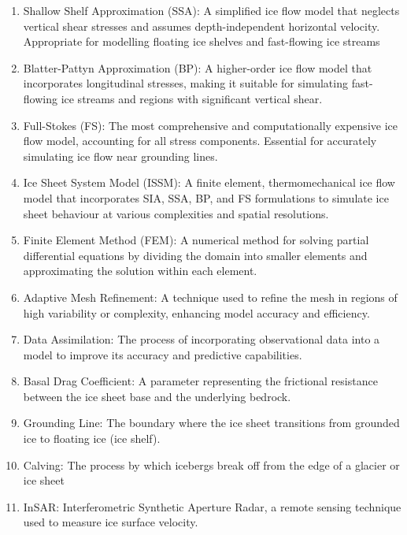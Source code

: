 \begin{enumerate}
\item Shallow Shelf Approximation (SSA): A simplified ice flow model that neglects vertical shear stresses and assumes depth-independent horizontal velocity. Appropriate for modelling floating ice shelves and fast-flowing ice streams
\item Blatter-Pattyn Approximation (BP): A higher-order ice flow model that incorporates longitudinal stresses, making it suitable for simulating fast-flowing ice streams and regions with significant vertical shear.
\item Full-Stokes (FS): The most comprehensive and computationally expensive ice flow model, accounting for all stress components. Essential for accurately simulating ice flow near grounding lines.
\item Ice Sheet System Model (ISSM): A finite element, thermomechanical ice flow model that incorporates SIA, SSA, BP, and FS formulations to simulate ice sheet behaviour at various complexities and spatial resolutions. 
\item Finite Element Method (FEM): A numerical method for solving partial differential equations by dividing the domain into smaller elements and approximating the solution within each element.
\item Adaptive Mesh Refinement: A technique used to refine the mesh in regions of high variability or complexity, enhancing model accuracy and efficiency.
\item Data Assimilation: The process of incorporating observational data into a model to improve its accuracy and predictive capabilities.
\item Basal Drag Coefficient: A parameter representing the frictional resistance between the ice sheet base and the underlying bedrock.
\item Grounding Line: The boundary where the ice sheet transitions from grounded ice to floating ice (ice shelf).
\item Calving: The process by which icebergs break off from the edge of a glacier or ice sheet
\item InSAR: Interferometric Synthetic Aperture Radar, a remote sensing technique used to measure ice surface velocity.
\end{enumerate}

